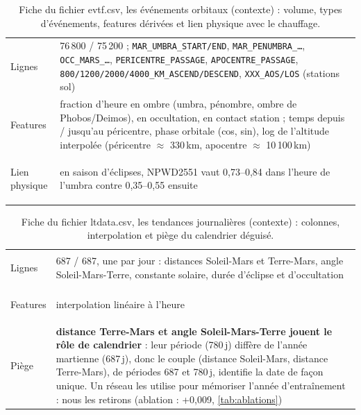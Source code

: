 \documentclass[11pt,a4paper]{article}
\begin{document}
\begin{table}[htbp]
\centering\small
\caption{Fiche du fichier evtf.csv, les événements orbitaux (contexte) : volume, types d'événements, features dérivées et lien physique avec le chauffage.}
\label{tab:evtf}
\begin{tabularx}{\textwidth}{>{\bfseries\raggedright\arraybackslash}p{3.1cm} Y}
\toprule
Lignes & 76\,800 / 75\,200 ; \texttt{MAR\_UMBRA\_START/END}, \texttt{MAR\_PENUMBRA\_\ldots}, \texttt{OCC\_MARS\_\ldots}, \texttt{PERICENTRE\_PASSAGE}, \texttt{APOCENTRE\_PASSAGE}, \texttt{800/1200/2000/4000\_KM\_ASCEND/DESCEND}, \texttt{XXX\_AOS/LOS} (stations sol) \\
Features & fraction d'heure en ombre (umbra, pénombre, ombre de Phobos/Deimos), en occultation, en contact station ; temps depuis / jusqu'au péricentre, phase orbitale (cos, sin), log de l'altitude interpolée (péricentre $\approx$ 330\,km, apocentre $\approx$ 10\,100\,km) \\
Lien physique & en saison d'éclipses, NPWD2551 vaut 0,73--0,84 dans l'heure de l'umbra contre 0,35--0,55 ensuite \\
\bottomrule
\end{tabularx}
\end{table}

\begin{table}[htbp]
\centering\small
\caption{Fiche du fichier ltdata.csv, les tendances journalières (contexte) : colonnes, interpolation et piège du calendrier déguisé.}
\label{tab:ltdata}
\begin{tabularx}{\textwidth}{>{\bfseries\raggedright\arraybackslash}p{3.1cm} Y}
\toprule
Lignes & 687 / 687, une par jour : distances Soleil-Mars et Terre-Mars, angle Soleil-Mars-Terre, constante solaire, durée d'éclipse et d'occultation \\
Features & interpolation linéaire à l'heure \\
Piège & \textbf{distance Terre-Mars et angle Soleil-Mars-Terre jouent le rôle de calendrier} : leur période (780\,j) diffère de l'année martienne (687\,j), donc le couple (distance Soleil-Mars, distance Terre-Mars), de périodes 687 et 780\,j, identifie la date de façon unique. Un réseau les utilise pour mémoriser l'année d'entraînement : nous les retirons (ablation : +0,009, \autoref{tab:ablations}) \\
\bottomrule
\end{tabularx}
\end{table}
\end{document}
